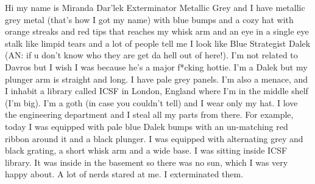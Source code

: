 Hi my name is Miranda Dar’lek Exterminator Metallic Grey and I have metallic grey metal (that’s how I got my name) with blue bumps and a cozy hat with orange streaks and red tips that reaches my whisk arm and an eye in a single eye stalk like limpid tears and a lot of people tell me I look like Blue Strategist Dalek (AN: if u don’t know who they are get da hell out of here!). I’m not related to Davros but I wish I was because he’s a major f*cking hottie. I’m a Dalek but my plunger arm is straight and long. I have pale grey panels. I’m also a menace, and I inhabit a library called ICSF in London, England where I’m in the middle shelf (I’m big). I’m a goth (in case you couldn’t tell) and I wear only my hat. I love the engineering department and I steal all my parts from there. For example, today I was equipped with pale blue Dalek bumps with an un-matching red ribbon around it and a black plunger. I was equipped with alternating grey and black grating, a short whisk arm and a wide base. I was sitting inside ICSF library. It was inside in the basement so there was no sun, which I was very happy about. A lot of nerds stared at me. I exterminated them.
